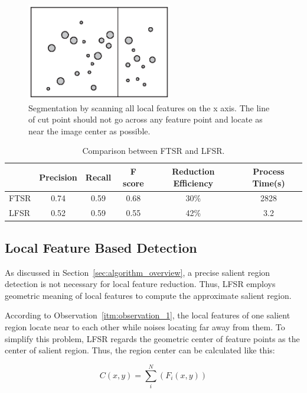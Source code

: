 \begin{figure}[!t]
\centering
\includegraphics[width=2.5in]{images/fig-segmentation.eps}
\caption{Segmentation by scanning all local features on the x axis. The line of cut point should not go across any feature point and locate as near the image center as possible.}
\label{fig:segmentation}
\end{figure}

\begin{table}[!t]
\begin{center}
\begin{tabular}{|l|c|c|c|c|c|}
\hline
 & Precision & Recall & F score & Reduction Efficiency & Process Time(s) \\
\hline\hline
FTSR & 0.74 & 0.59 & 0.68 & 30\% & 2828 \\
LFSR & 0.52 & 0.59 & 0.55 & 42\% & 3.2 \\
\hline
\end{tabular}
\end{center}
\caption{Comparison between FTSR and LFSR.}
\label{tab:comparison}
\end{table}

\subsection{Local Feature Based Detection}
\label{sec:algorithm_detection}

As discussed in Section~\ref{sec:algorithm_overview}, a precise salient region detection is not necessary for local feature reduction. Thus, LFSR employs geometric meaning of local features to compute the approximate salient region.

According to Observation~\ref{itm:observation_1}, the local features of one salient region locate near to each other while noises locating far away from them. To simplify this problem, LFSR regards the geometric center of feature points as the center of salient region. Thus, the region center can be calculated like this:

{\begin{equation} \label{eq:center}
C(x, y) = \sum_{i}^{N}\left({F}_{i}(x, y) \right)
\end{equation}}

